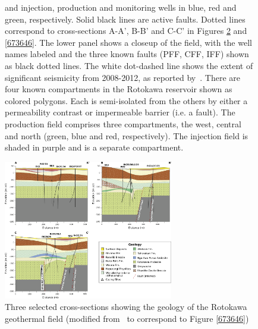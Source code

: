 \begin{figure}[p]
\begin{center}
{{and injection, production and monitoring wells in blue, red and green, respectively. Solid
black lines are active faults. Dotted lines correspond to cross-sections A-A', B-B' and C-C' in Figures \ref{599670} and \ref{673646}. The lower panel shows a closeup of the
field, with the well names labeled and the three known faults (\acrshort{PFF}, \acrshort{CFF},
\acrshort{IFF}) shown as black dotted lines. The white dot-dashed line shows the
extent of significant seismicity from 2008-2012, as reported
by~\protect\citet{Sherburn_2015}. There are four known compartments in the Rotokawa
reservoir shown as colored polygons. Each is semi-isolated from the
others by either a \gls{permeability} contrast or impermeable barrier (i.e. a
fault). The production field comprises three compartments, the west,
central and north (green, blue and red, respectively). The injection
field is shaded in purple and is a separate compartment.
{\label{838185}}%
}}
\end{center}
\end{figure}

\begin{figure}
\begin{center}
\includegraphics[width=0.66\textwidth,height=\textheight,keepaspectratio]{Chapter_1_Intro/figures/Rotokawa_geology_11-20/Rotokawa_geology_3-20}
\caption[Selected cross-sections of Rotokawa geology]{{
Three selected cross-sections showing the geology of the Rotokawa
geothermal field (modified from~\protect\citet{Sewell_2015} to correspond to
Figure {\ref{673646}})
{\label{599670}}%
}}
\end{center}
\end{figure}

